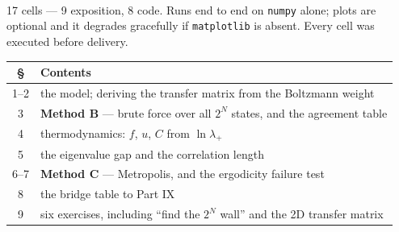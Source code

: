 \begin{haveit}[title={The companion notebook}]
\\[5pt]
17 cells --- 9 exposition, 8 code. Runs end to end on \texttt{numpy} alone; plots are optional and it
degrades gracefully if \texttt{matplotlib} is absent. Every cell was executed before delivery.

\begin{center}\small
\begin{tabular}{@{}cl@{}}
\toprule
\rowcolor{bio!12}
\textbf{§} & \textbf{Contents}\\
\midrule
1--2 & the model; deriving the transfer matrix from the Boltzmann weight\\
3 & \textbf{Method B} --- brute force over all $2^N$ states, and the agreement table\\
4 & thermodynamics: $f$, $u$, $C$ from $\ln\lambda_+$\\
5 & the eigenvalue gap and the correlation length\\
6--7 & \textbf{Method C} --- Metropolis, and the ergodicity failure test\\
8 & the bridge table to Part IX\\
9 & six exercises, including ``find the $2^N$ wall'' and the 2D transfer matrix\\
\bottomrule
\end{tabular}
\end{center}
\end{haveit}

